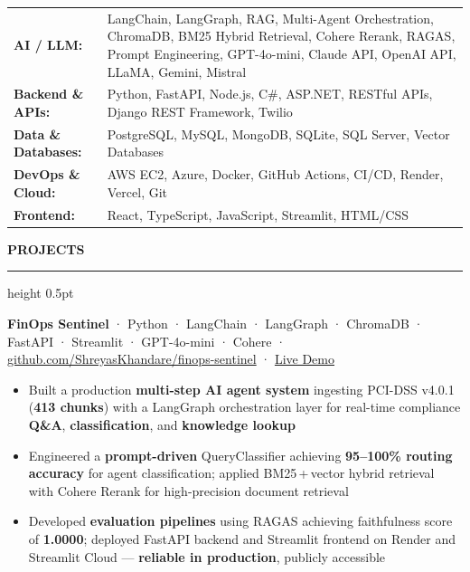 \documentclass[10pt, letterpaper]{article}
\newcommand{\resumesection}[1]{%
  \vspace{8pt}%
  {\large\bfseries\color{navy} #1}%
  \vspace{2pt}%
  \hrule height 0.5pt \color{navy}%
  \vspace{4pt}%
}
\begin{document}
\renewcommand{\arraystretch}{1.35}
\begin{tabularx}{\linewidth}{@{} >{\bfseries\color{navy}\fontsize{9.5pt}{11pt}\selectfont}l
                                   @{\hspace{4pt}} >{\color{darktext}\fontsize{9.5pt}{11pt}\selectfont}X @{}}
  AI / LLM:       & LangChain, LangGraph, RAG, Multi-Agent Orchestration, ChromaDB, BM25 Hybrid Retrieval, Cohere Rerank, RAGAS, Prompt Engineering, GPT-4o-mini, Claude API, OpenAI API, LLaMA, Gemini, Mistral \\
  Backend \& APIs: & Python, FastAPI, Node.js, C\#, ASP.NET, RESTful APIs, Django REST Framework, Twilio \\
  Data \& Databases: & PostgreSQL, MySQL, MongoDB, SQLite, SQL Server, Vector Databases \\
  DevOps \& Cloud: & AWS EC2, Azure, Docker, GitHub Actions, CI/CD, Render, Vercel, Git \\
  Frontend:       & React, TypeScript, JavaScript, Streamlit, HTML/CSS \\
\end{tabularx}

\resumesection{PROJECTS}

\vspace{2pt}
{\fontsize{9.5pt}{12pt}\selectfont
  \textbf{\color{darktext}FinOps Sentinel}\enspace
  \textcolor{mutedtext}{·\enspace
    {\fontsize{8.5pt}{11pt}\selectfont
      Python · LangChain · LangGraph · ChromaDB · FastAPI · Streamlit · GPT-4o-mini · Cohere
    }
  }\enspace
  \textcolor{midblue}{\fontsize{8.5pt}{11pt}\selectfont
    ·\enspace
    \href{https://github.com/ShreyasKhandare/finops-sentinel}{github.com/ShreyasKhandare/finops-sentinel}
    \enspace·\enspace
    \href{https://shreyas-finops-sentinel.streamlit.app}{Live Demo}
  }
}

\begin{itemize}
  \item Built a production \textbf{multi-step AI agent system} ingesting PCI-DSS v4.0.1 (\textbf{413 chunks}) with a LangGraph orchestration layer for real-time compliance \textbf{Q\&A}, \textbf{classification}, and \textbf{knowledge lookup}
  \item Engineered a \textbf{prompt-driven} QueryClassifier achieving \textbf{95--100\% routing accuracy} for agent classification; applied BM25\,+\,vector hybrid retrieval with Cohere Rerank for high-precision document retrieval
  \item Developed \textbf{evaluation pipelines} using RAGAS achieving faithfulness score of \textbf{1.0000}; deployed FastAPI backend and Streamlit frontend on Render and Streamlit Cloud --- \textbf{reliable in production}, publicly accessible
\end{itemize}
\end{document}
